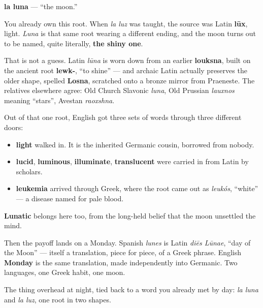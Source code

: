 \begin{cousinweb}
\textbf{la luna} — \textquotedblleft{}the moon.\textquotedblright{}

You already own this root. When \emph{la luz} was taught, the source was Latin \textbf{lūx}, light. \emph{Luna} is that same root wearing a different ending, and the moon turns out to be named, quite literally, \textbf{the shiny one}.

That is not a guess. Latin \emph{lūna} is worn down from an earlier \textbf{louksna}, built on the ancient root \textbf{lewk-}, \textquotedblleft{}to shine\textquotedblright{} — and archaic Latin actually preserves the older shape, spelled \textbf{Losna}, scratched onto a bronze mirror from Praeneste. The relatives elsewhere agree: Old Church Slavonic \emph{luna}, Old Prussian \emph{lauxnos} meaning \textquotedblleft{}stars\textquotedblright{}, Avestan \emph{raoxshna}.

Out of that one root, English got three sets of words through three different doors:

\begin{itemize}
\raggedright
  \item \textbf{light} walked in. It is the inherited Germanic cousin, borrowed from nobody.
  \item \textbf{lucid}, \textbf{luminous}, \textbf{illuminate}, \textbf{translucent} were carried in from Latin by scholars.
  \item \textbf{leukemia} arrived through Greek, where the root came out as \emph{leukós}, \textquotedblleft{}white\textquotedblright{} — a disease named for pale blood.
\end{itemize}

\textbf{Lunatic} belongs here too, from the long-held belief that the moon unsettled the mind.

Then the payoff lands on a Monday. Spanish \emph{lunes} is Latin \emph{diēs Lūnae}, \textquotedblleft{}day of the Moon\textquotedblright{} — itself a translation, piece for piece, of a Greek phrase. English \textbf{Monday} is the same translation, made independently into Germanic. Two languages, one Greek habit, one moon.
\end{cousinweb}

\begin{grammarlens}[title={What you've built}]
The thing overhead at night, tied back to a word you already met by day: \emph{la luna} and \emph{la luz}, one root in two shapes.
\end{grammarlens}

